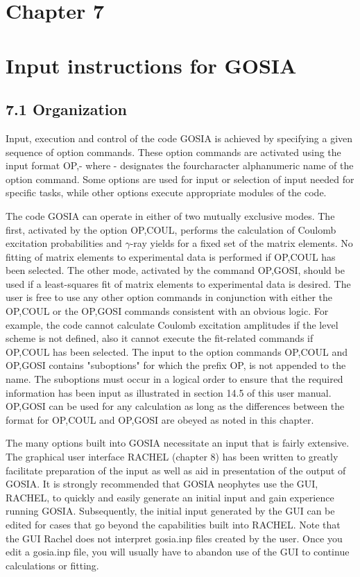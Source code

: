 \documentclass[10pt]{article}
\begin{document}
\section*{Chapter 7}
\section*{Input instructions for GOSIA}


\subsection*{7.1 Organization}
Input, execution and control of the code GOSIA is achieved by specifying a given sequence of option commands. These option commands are activated using the input format OP,- where - designates the fourcharacter alphanumeric name of the option command. Some options are used for input or selection of input needed for specific tasks, while other options execute appropriate modules of the code.

The code GOSIA can operate in either of two mutually exclusive modes. The first, activated by the option OP,COUL, performs the calculation of Coulomb excitation probabilities and $\gamma$-ray yields for a fixed set of the matrix elements. No fitting of matrix elements to experimental data is performed if OP,COUL has been selected. The other mode, activated by the command OP,GOSI, should be used if a least-squares fit of matrix elements to experimental data is desired. The user is free to use any other option commands in conjunction with either the OP,COUL or the OP,GOSI commands consistent with an obvious logic. For example, the code cannot calculate Coulomb excitation amplitudes if the level scheme is not defined, also it cannot execute the fit-related commands if OP,COUL has been selected. The input to the option commands OP,COUL and OP,GOSI contains "suboptions" for which the prefix OP, is not appended to the name. The suboptions must occur in a logical order to ensure that the required information has been input as illustrated in section 14.5 of this user manual. OP,GOSI can be used for any calculation as long as the differences between the format for OP,COUL and OP,GOSI are obeyed as noted in this chapter.

The many options built into GOSIA necessitate an input that is fairly extensive. The graphical user interface RACHEL (chapter 8) has been written to greatly facilitate preparation of the input as well as aid in presentation of the output of GOSIA. It is strongly recommended that GOSIA neophytes use the GUI, RACHEL, to quickly and easily generate an initial input and gain experience running GOSIA. Subsequently, the initial input generated by the GUI can be edited for cases that go beyond the capabilities built into RACHEL. Note that the GUI Rachel does not interpret gosia.inp files created by the user. Once you edit a gosia.inp file, you will usually have to abandon use of the GUI to continue calculations or fitting.
\end{document}
